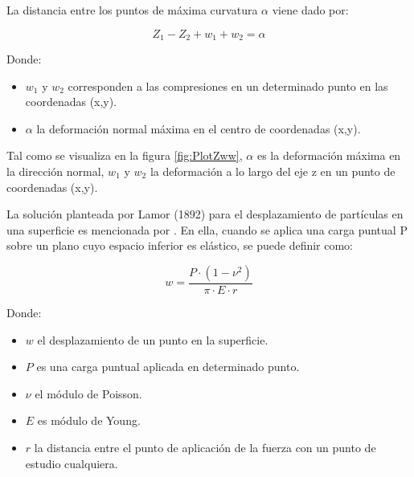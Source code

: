 \documentclass[main]{subfiles}
\begin{document}
La distancia entre los puntos de máxima curvatura $\alpha$ viene dado por:  

  \begin{equation}
  \label{eq:Eq2}
  Z_1-Z_2+w_1+w_2=\alpha
  \end{equation}

\par \hspace{1cm}
\begin{minipage}{10cm}
\begin{spacing}{0.5}
Donde:
\begin{itemize}
\item $w_1$ y $w_2$ corresponden a las compresiones en un determinado punto en las coordenadas (x,y).
\item $\alpha$ la deformación normal máxima en el centro de coordenadas (x,y).
\end{itemize}
\end{spacing}
\end{minipage}

Tal como se visualiza en la figura \ref{fig:PlotZww}, $\alpha$ es la deformación máxima en la dirección normal, $w_1$ y $w_2$ la deformación a lo largo del eje z en un punto de coordenadas (x,y). 

La solución planteada por Lamor (1892) para el desplazamiento de partículas en una superficie es mencionada por \citet{timoshenko1970theory}. En ella, cuando se aplica una carga puntual P sobre un plano cuyo espacio inferior es elástico, se puede definir como:

  \begin{equation}
  \label{eq:Eq3}
  w=\frac{P \cdot (1-\nu^2)}{\pi \cdot E \cdot r}
  \end{equation}

\par \hspace{1cm}
\begin{minipage}{10cm}
\begin{spacing}{0.5}
Donde:
\begin{itemize}
\item $w$ el desplazamiento de un punto en la superficie.
\item $P$ es una carga puntual aplicada en determinado punto.
\item $\nu$ el módulo de Poisson.
\item $E$ es módulo de Young.
\item $r$ la distancia entre el punto de aplicación de la fuerza con un punto de estudio cualquiera.
\end{itemize}
\end{spacing}
\end{minipage}
\end{document}
